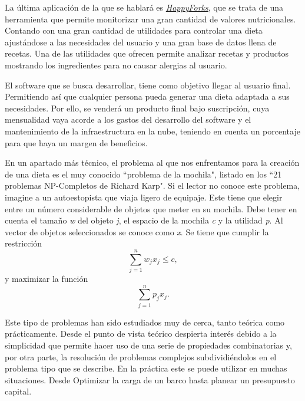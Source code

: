 La última aplicación de la que se hablará es \href{https://happyforks.com/}{\emph{HappyForks}}, que se trata de una herramienta que permite monitorizar una gran cantidad de valores nutricionales. Contando con una gran cantidad de utilidades para controlar una dieta ajustándose a las necesidades del usuario y una gran base de datos llena de recetas. Una de las utilidades que ofrecen permite analizar recetas y productos mostrando los ingredientes para no causar alergias al usuario. 

El software que se busca desarrollar, tiene como objetivo llegar al usuario final. Permitiendo así que cualquier persona pueda generar una dieta adaptada a sus necesidades. Por ello, se venderá un producto final bajo suscripción, cuya mensualidad vaya acorde a los gastos del desarrollo del software y el mantenimiento de la infraestructura en la nube, teniendo en cuenta un porcentaje para que haya un margen de beneficios.

En un apartado más técnico, el problema al que nos enfrentamos para la creación de una dieta es el muy conocido ``problema de la mochila", listado en los ``21 problemas NP-Completos de Richard Karp". Si el lector no conoce este problema, imagine a un autoestopista que viaja ligero de equipaje. Este tiene que elegir entre un número considerable de objetos que meter en su mochila. Debe tener en cuenta el tamaño \emph{w} del objeto \emph{j}, el espacio de la mochila \emph{c} y la utilidad \emph{p}. Al vector de objetos seleccionados se conoce como \emph{x}. Se tiene que cumplir la restricción
\begin{equation}
    \sum_{j=1}^{n}w_{j}x_{j} \leq c,
\end{equation}
y maximizar la función
\begin{equation}
    \sum_{j=1}^{n}p_{j}x_{j}.
\end{equation}

Este tipo de problemas han sido estudiados muy de cerca, tanto teórica como prácticamente. Desde el punto de vista teórico despierta interés debido a la simplicidad que permite hacer uso de una serie de propiedades combinatorias y, por otra parte, la resolución de problemas complejos subdividiéndolos en el problema tipo que se describe. En la práctica este se puede utilizar en muchas situaciones. Desde Optimizar la carga de un barco hasta planear un presupuesto capital. \cite{martello1990knapsack}

